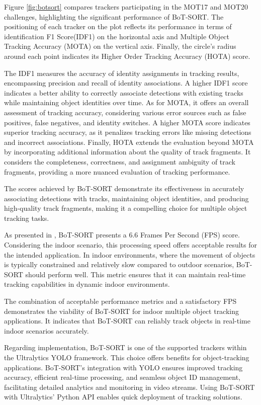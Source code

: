 Figure \ref{fig:botsort} compares trackers participating in the MOT17 and MOT20 challenges, highlighting the significant performance of BoT-SORT. The positioning of each tracker on the plot reflects its performance in terms of identification F1 Score(IDF1) on the horizontal axis and Multiple Object Tracking Accuracy (MOTA) on the vertical axis. Finally, the circle's radius around each point indicates its Higher Order Tracking Accuracy (HOTA) score.

The IDF1 measures the accuracy of identity assignments in tracking results, encompassing precision and recall of identity associations. A higher IDF1 score indicates a better ability to correctly associate detections with existing tracks while maintaining object identities over time. As for MOTA, it offers an overall assessment of tracking accuracy, considering various error sources such as false positives, false negatives, and identity switches. A higher MOTA score indicates superior tracking accuracy, as it penalizes tracking errors like missing detections and incorrect associations.  Finally, HOTA extends the evaluation beyond MOTA by incorporating additional information about the quality of track fragments. It considers the completeness, correctness, and assignment ambiguity of track fragments, providing a more nuanced evaluation of tracking performance.

The scores achieved by BoT-SORT demonstrate its effectiveness in accurately associating detections with tracks, maintaining object identities, and producing high-quality track fragments, making it a compelling choice for multiple object tracking tasks.

As presented in \cite{botsort}, BoT-SORT presents a 6.6 Frames Per Second (FPS) score. Considering the indoor scenario, this processing speed offers acceptable results for the intended application. In indoor environments, where the movement of objects is typically constrained and relatively slow compared to outdoor scenarios, BoT-SORT should perform well. This metric ensures that it can maintain real-time tracking capabilities in dynamic indoor environments.

The combination of acceptable performance metrics and a satisfactory FPS demonstrates the viability of BoT-SORT for indoor multiple object tracking applications. It indicates that BoT-SORT can reliably track objects in real-time indoor scenarios accurately.

Regarding implementation, BoT-SORT is one of the supported trackers within the Ultralytics YOLO framework. This choice offers benefits for object-tracking applications. BoT-SORT's integration with YOLO ensures improved tracking accuracy, efficient real-time processing, and seamless object ID management, facilitating detailed analytics and monitoring in video streams. Using BoT-SORT with Ultralytics' Python API enables quick deployment of tracking solutions. 

